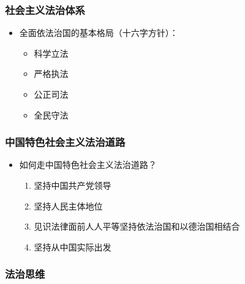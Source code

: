 \hypertarget{ux793eux4f1aux4e3bux4e49ux6cd5ux6cbbux4f53ux7cfb}{%
\subsubsection{社会主义法治体系}\label{ux793eux4f1aux4e3bux4e49ux6cd5ux6cbbux4f53ux7cfb}}

\begin{itemize}
\tightlist
\item
  全面依法治国的基本格局（十六字方针）：

  \begin{itemize}
  \tightlist
  \item
    科学立法
  \item
    严格执法
  \item
    公正司法
  \item
    全民守法
  \end{itemize}
\end{itemize}

\hypertarget{ux4e2dux56fdux7279ux8272ux793eux4f1aux4e3bux4e49ux6cd5ux6cbbux9053ux8def}{%
\subsubsection{中国特色社会主义法治道路}\label{ux4e2dux56fdux7279ux8272ux793eux4f1aux4e3bux4e49ux6cd5ux6cbbux9053ux8def}}

\begin{itemize}
\tightlist
\item
  如何走中国特色社会主义法治道路？

  \begin{enumerate}
  \def\labelenumi{\arabic{enumi}.}
  \tightlist
  \item
    坚持中国共产党领导
  \item
    坚持人民主体地位
  \item
    见识法律面前人人平等坚持依法治国和以德治国相结合
  \item
    坚持从中国实际出发
  \end{enumerate}
\end{itemize}

\hypertarget{ux6cd5ux6cbbux601dux7ef4}{%
\subsubsection{法治思维}\label{ux6cd5ux6cbbux601dux7ef4}}

